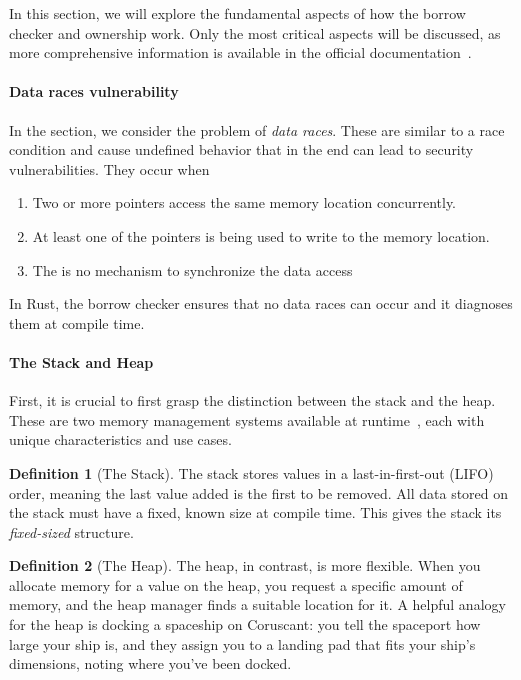 \documentclass[11pt]{report}
\theoremstyle{definition}
\newtheorem{definition}{Definition}[section]
\theoremstyle{plain}
\begin{document}
In this section, we will explore the fundamental aspects of how the borrow checker and ownership work. Only the most critical aspects will be discussed, as more comprehensive information is available in the official documentation~\cite{rustlangRustProgramming}.

\paragraph{Data races vulnerability}
In the section, we consider the problem of \textit{data races}. These are similar to a race condition and cause undefined behavior that in the end can lead to security vulnerabilities. They occur when
\begin{enumerate}[parsep=0pt, itemsep=0pt]
  \item Two or more pointers access the same memory location concurrently.
  \item At least one of the pointers is being used to write to the memory location.
  \item The is no mechanism to synchronize the data access
\end{enumerate}
In Rust, the borrow checker ensures that no data races can occur and it diagnoses them at compile time.

\paragraph{The Stack and Heap}
First, it is crucial to first grasp the distinction between the stack and the heap. These are two memory management systems available at runtime~\cite[ch.4]{rustlangRustProgramming}, each with unique characteristics and use cases.

\begin{definition}[The Stack]
  The stack stores values in a last-in-first-out (LIFO) order, meaning the last value added is the first to be removed. All data stored on the stack must have a fixed, known size at compile time. This gives the stack its \textit{fixed-sized} structure.
\end{definition}

\begin{definition}[The Heap]
  The heap, in contrast, is more flexible. When you allocate memory for a value on the heap, you request a specific amount of memory, and the heap manager finds a suitable location for it. A helpful analogy for the heap is docking a spaceship on Coruscant: you tell the spaceport how large your ship is, and they assign you to a landing pad that fits your ship's dimensions, noting where you've been docked.
\end{definition}
\end{document}
